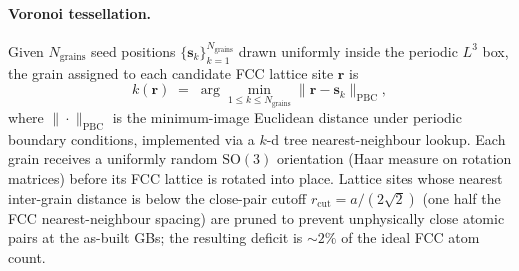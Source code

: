 
\paragraph*{Voronoi tessellation.}
Given $N_\mathrm{grains}$ seed positions
$\{\mathbf{s}_k\}_{k=1}^{N_\mathrm{grains}}$ drawn uniformly inside the
periodic $L^3$ box, the grain assigned to each candidate FCC lattice
site $\mathbf{r}$ is
\begin{equation}\label{eq:voronoi}
k(\mathbf{r}) \;=\; \arg\min_{1 \le k \le N_\mathrm{grains}}
\big\| \mathbf{r} - \mathbf{s}_k \big\|_\mathrm{PBC} ,
\end{equation}
where $\|\cdot\|_\mathrm{PBC}$ is the minimum-image Euclidean distance
under periodic boundary conditions, implemented via a $k$-d tree
nearest-neighbour lookup. Each grain receives a uniformly random
$\mathrm{SO}(3)$ orientation (Haar measure on rotation matrices) before
its FCC lattice is rotated into place. Lattice sites whose nearest
inter-grain distance is below the close-pair cutoff
$r_\mathrm{cut} = a/(2\sqrt{2})$ (one half the FCC nearest-neighbour
spacing) are pruned to prevent unphysically close atomic pairs at
the as-built GBs; the resulting deficit is $\sim 2\%$ of the ideal
FCC atom count.



